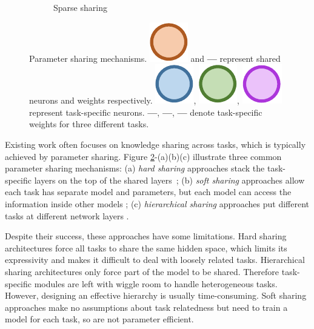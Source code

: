 \documentclass[letterpaper]{article} %
\begin{document}
\begin{figure}[htb]
\begin{subfigure}{0.45\linewidth}
\caption{Sparse sharing}
\label{sfig:sparse-sharing}
\end{subfigure}\hfill
\caption{Parameter sharing mechanisms. \includegraphics[scale=0.25]{3353_shared_neuron.pdf} and \textcolor[rgb]{0.68,0.35,0.13}{\textbf{---}} represent shared neurons and weights respectively. \includegraphics[scale=0.25]{3353_taskA_neuron.pdf}, \includegraphics[scale=0.25]{3353_taskB_neuron.pdf}, \includegraphics[scale=0.25]{3353_taskC_neuron.pdf} represent task-specific neurons. \textcolor[rgb]{0.36,0.61,0.84}{\textbf{---}}, \textcolor[rgb]{0.44,0.68,0.28}{\textbf{---}}, \textcolor[rgb]{0.67,0.21,0.86}{\textbf{---}} denote task-specific weights for three different tasks.}
\label{fig:param-sharing}
\end{figure}


Existing work often focuses on knowledge sharing across tasks, which is typically achieved by parameter sharing. Figure \ref{fig:param-sharing}-(a)(b)(c) illustrate three common parameter sharing mechanisms: (a) \emph{hard sharing} approaches stack the task-specific layers on the top of the shared layers~\cite{DBLP:conf/icml/CollobertW08,DBLP:conf/iclr/SubramanianTBP18,DBLP:conf/acl/LiuHCG19}; (b) \emph{soft sharing} approaches allow each task has separate model and parameters, but each model can access the information inside other models \cite{DBLP:conf/cvpr/MisraSGH16,DBLP:conf/ijcai/LiuQH16,DBLP:conf/aaai/RuderBAS19}; (c) \emph{hierarchical sharing} approaches put different tasks at different network layers \cite{DBLP:conf/acl/SogaardG16,DBLP:conf/emnlp/HashimotoXTS17}.

Despite their success, these approaches have some limitations. Hard sharing architectures force all tasks to share the same hidden space, which limits its expressivity and makes it difficult to deal with loosely related tasks. Hierarchical sharing architectures only force part of the model to be shared. Therefore task-specific modules are left with wiggle room to handle heterogeneous tasks. However, designing an effective hierarchy is usually time-consuming. Soft sharing approaches make no assumptions about task relatedness but need to train a model for each task, so are not parameter efficient.
\end{document}
